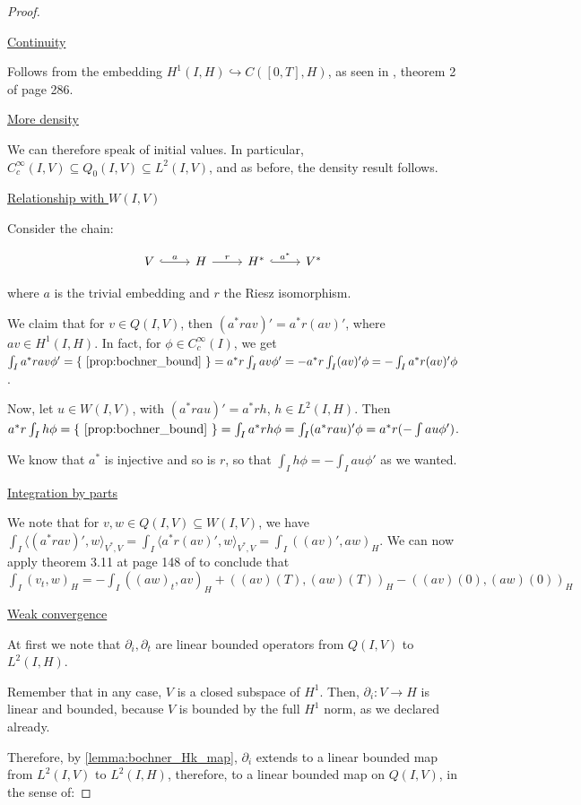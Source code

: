 \documentclass[english,a4paper,9pt,oneside]{scrbook}	%
\theoremstyle{break}
\newenvironment{mproof}[1][\proofname]{%
  \begin{proof}[#1]$ $\par\nobreak\ignorespaces
}{%
  \end{proof}
}
\renewcommand*{\proofname}{Proof}
\theoremstyle{remark}
\newcommand{\emb}{\hookrightarrow}
\newcommand{\ind}[1]{\{\text{ #1 }\}}
\begin{document}
\begin{appendices}
\begin{mproof}
\underline{Continuity}

Follows from the embedding $H^1(I,H)\emb C([0,T],H)$, as seen in \cite{evans}, theorem 2 of page 286.

\underline{More density}

We can therefore speak of initial values. In particular,  $C_c^\infty(I,V) \subseteq Q_0(I,V)\subseteq L^2(I,V)$, and as before, the density result follows.

\underline{Relationship with $W(I,V)$}

Consider the chain:

\[\begin{tikzcd}
	V & H & {H^*} & {V^*}
	\arrow["a", hook, from=1-1, to=1-2]
	\arrow["r", from=1-2, to=1-3]
	\arrow["{a^*}", hook, from=1-3, to=1-4]
\end{tikzcd}\]

where $a$ is the trivial embedding and $r$ the Riesz isomorphism.

We claim that for $v \in Q(I,V)$, then $(a^*ra v)' = a^*r (av)'$, where $av \in H^1(I,H)$. In fact, for $\phi \in C^\infty_c(I)$, we get $\int_I a^*ra v \phi' = \ind{\cref{prop:bochner_bound}} = a^*r\int_I av\phi' = -a^*r\int_I(av)'\phi =-\int_I a^*r(av)' \phi$.

Now, let $u \in W(I,V)$, with $(a^*ra u)' = a^*r h$, $h \in L^2(I,H)$. Then $ a^*r \int_I h \phi = \ind{\cref{prop:bochner_bound}} = \int_I a^*r h \phi  = \int_I (a^*ra u)' \phi =  a^*r (-\int au \phi')$.

We know that $a^*$ is injective and so is $r$, so that $ \int_I h \phi  = -\int_I au \phi'$ as we wanted.

\underline{Integration by parts}

We note that for $v,w \in Q(I,V)\subseteq W(I,V)$, we have $\int_I \langle (a^*ra v)', w\rangle_{V^*,V} = \int_I \langle a^*r(a v)', w\rangle_{V^*,V} = \int_I((a v)', aw)_H$. We can now apply theorem 3.11 at page 148 of \cite{trol} to conclude that  $\int_I(v_t,w)_H = -\int_I((aw)_t,av)_H +((av)(T),(aw)(T))_H-((av)(0),(aw)(0))_H$

\underline{Weak convergence}

At first we note that $\partial_i, \partial_t$ are linear bounded operators from $Q(I,V)$ to $L^2(I,H)$.

Remember that in any case, $V$ is a closed subspace of $H^1$. Then, $\partial_i : V\rightarrow H$ is linear and bounded, because $V$ is bounded by the full $H^1$ norm, as we declared already.

Therefore, by \cref{lemma:bochner_Hk_map}, $\partial_i$ extends to a linear bounded map from $L^2(I,V)$ to $L^2(I,H)$, therefore, to a linear bounded map on $Q(I,V)	$, in the sense of:


\end{mproof}
\end{appendices}
\end{document}

